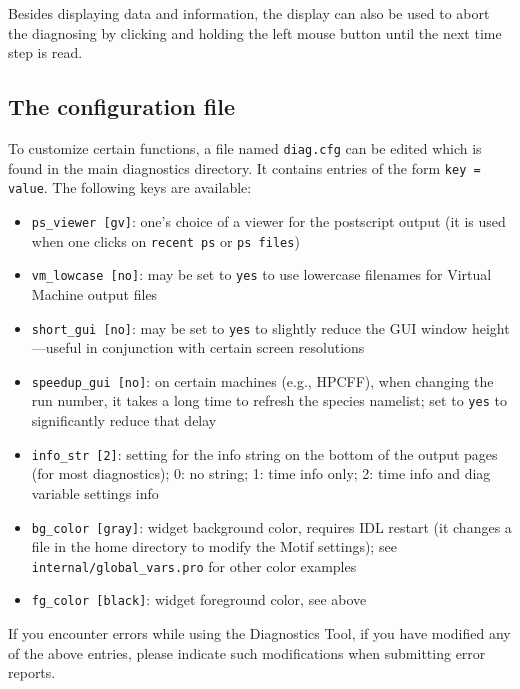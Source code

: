 \documentclass[12pt]{article}
\begin{document}
Besides displaying data and information, the display can also
be used to abort the diagnosing by clicking and holding the left
mouse button until the next time step is read.

\subsection{The configuration file}

To customize certain functions, a file named \texttt{diag.cfg} can be
edited which is found in the main diagnostics directory. It contains
entries of the form \verb|key = value|. The following keys are
available:
\begin{itemize}
\item \texttt{ps\_viewer [gv]}: one's choice of a viewer for the
postscript output (it is used when one clicks on \verb|recent ps| or
\verb|ps files|)
\item \texttt{vm\_lowcase [no]}: may be set to \verb|yes| to use
lowercase filenames for Virtual Machine output files
\item \texttt{short\_gui [no]}: may be set to \verb|yes| to slightly
reduce the GUI window height---useful in conjunction with certain
screen resolutions
\item \texttt{speedup\_gui [no]}: on certain machines (e.g., HPCFF),
when changing the run number, it takes a long time to refresh the
species namelist; set to \verb|yes| to significantly reduce that delay
\item \texttt{info\_str [2]}: setting for the info string on the
bottom of the output pages (for most diagnostics); 0: no string; 1:
time info only; 2: time info and diag variable settings info
\item \texttt{bg\_color [gray]}: widget background color, requires IDL
restart (it changes a file in the home directory to modify the Motif
settings); see \texttt{internal/global\_vars.pro} for other color
examples
\item \texttt{fg\_color [black]}: widget foreground color, see above
\end{itemize}
If you encounter errors while using the \gene Diagnostics Tool, if you
have modified any of the above entries, please indicate such
modifications when submitting error reports.


\newpage
\end{document}
